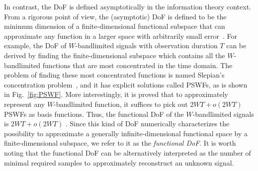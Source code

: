 \documentclass[journal,twocolumn]{IEEEtran}
\begin{document}
In contrast, the DoF is defined asymptotically in the information theory context. From a rigorous point of view, the (asymptotic) DoF is defined to be the minimum dimension of a finite-dimensional functional subspace that can approximate any function in a larger space with arbitrarily small error~\cite{poon2005degrees}. For example, the DoF of $W$-bandlimited signals with observation duration $T$ can be derived by finding the finite-dimensional subspace which contains all the $W$-bandlimited functions that are most concentrated in the time domain. The problem of finding these most concentrated functions is named Slepian's concentration problem~\cite{slepian1976bandwidth}, and it has explicit solutions called PSWFs, as is shown in Fig.~\ref{fig:PSWF}.
More interestingly, it is proved that to approximately represent any $W$-bandlimited function, it suffices to pick out $2WT+o(2WT)$ PSWFs as basis functions. Thus, the functional DoF of the $W$-bandlimited signals is $2WT+o(2WT)$ \cite{slepian1976bandwidth}. 
Since this kind of DoF numerically characterizes the possibility to approximate a generally infinite-dimensional functional space by a finite-dimensional subspace, we refer to it as the {{\emph{functional DoF}}}. 
It is worth noting that the functional DoF can be alternatively interpreted as the number of minimal required samples to approximately reconstruct an unknown signal. 
\end{document}
